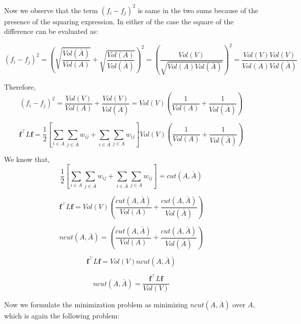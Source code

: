 \documentclass[english]{article}
\theoremstyle{plain}
\begin{document}
Now we observe that the term $(f_{i}-f_{j})^{2}$ is same in the two sums because of the presence of the squaring expression. In either of the case the square of the difference can be evaluated as:

\begin{equation}
(f_{i}-f_{j})^{2} = \left(\sqrt{\frac{Vol(\bar{A})}{Vol(A)}} + \sqrt{\frac{Vol(A)}{Vol(\bar{A})}}\right)^{2} = \left( \frac{Vol(V)}{\sqrt{Vol(A)Vol(\bar{A})}} \right)^{2} = \frac{Vol(V)Vol(V)}{Vol(A)Vol(\bar{A})}  
\end{equation}

Therefore,
\begin{equation}
(f_{i}-f_{j})^{2} =
\frac{Vol(V)}{Vol(A)} + \frac{Vol(V)}{Vol(\bar{A})} = Vol(V)\left(\frac{1}{Vol(A)} + \frac{1}{Vol(\bar{A})}\right)
\end{equation}

\begin{equation}
\boldsymbol{f}^{\top}L\boldsymbol{f} = \frac{1}{2} \left[ \sum_{i \in A} \sum_{j \in \bar{A}}  w_{ij} + \sum_{i \in \bar{A}} \sum_{j \in A}  w_{ij}\right] Vol(V)\left(\frac{1}{Vol(A)} + \frac{1}{Vol(\bar{A})}\right)
\end{equation}

We know that,
\begin{equation}
\frac{1}{2} \left[ \sum_{i \in A} \sum_{j \in \bar{A}}  w_{ij} + \sum_{i \in \bar{A}} \sum_{j \in A}  w_{ij}\right] = cut(A,\bar{A})
\end{equation}

\begin{equation}
\boldsymbol{f}^{\top}L\boldsymbol{f} = Vol(V)\left(\frac{cut(A,\bar{A})}{Vol(A)} + \frac{cut(A,\bar{A})}{Vol(\bar{A})}\right)
\end{equation}

\begin{equation}
ncut(A,\bar{A}) = \left(\frac{cut(A,\bar{A})}{Vol(A)} + \frac{cut(A,\bar{A})}{Vol(\bar{A})}\right)
\end{equation}

\begin{equation}
\boldsymbol{f}^{\top}L\boldsymbol{f} = Vol(V) ncut(A,\bar{A})
\end{equation}

\begin{equation}
ncut(A,\bar{A}) =\frac{\boldsymbol{f}^{\top}L\boldsymbol{f}}{Vol(V)} 
\end{equation}

Now we formulate the minimization problem as minimizing $ncut(A,\bar{A})$ over $A$, which is again the following problem:
\end{document}
